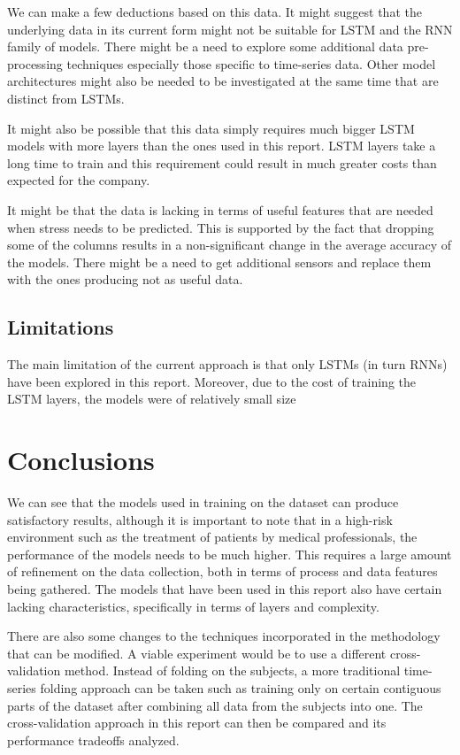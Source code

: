 \documentclass{article}
\begin{document}
We can make a few deductions based on this data. It might suggest that the underlying data in its current form might not be suitable for LSTM and the RNN family of models. There might be a need to explore some additional data pre-processing techniques especially those specific to time-series data. Other model architectures might also be needed to be investigated at the same time that are distinct from LSTMs.

It might also be possible that this data simply requires much bigger LSTM models with more layers than the ones used in this report. LSTM layers take a long time to train and this requirement could result in much greater costs than expected for the company.

It might be that the data is lacking in terms of useful features that are needed when stress needs to be predicted. This is supported by the fact that dropping some of the columns results in a non-significant change in the average accuracy of the models. There might be a need to get additional sensors and replace them with the ones producing not as useful data.


\subsection{Limitations}
The main limitation of the current approach is that only LSTMs (in turn RNNs) have been explored in this report. Moreover, due to the cost of training the LSTM layers, the models were of relatively small size


\section{Conclusions}
We can see that the models used in training on the dataset can produce satisfactory results, although it is important to note that in a high-risk environment such as the treatment of patients by medical professionals, the performance of the models needs to be much higher. This requires a large amount of refinement on the data collection, both in terms of process and data features being gathered. The models that have been used in this report also have certain lacking characteristics, specifically in terms of layers and complexity. 

There are also some changes to the techniques incorporated in the methodology that can be modified. A viable experiment would be to use a different cross-validation method. Instead of folding on the subjects, a more traditional time-series folding approach can be taken such as training only on certain contiguous parts of the dataset after combining all data from the subjects into one. The cross-validation approach in this report can then be compared and its performance tradeoffs analyzed.
\end{document}
